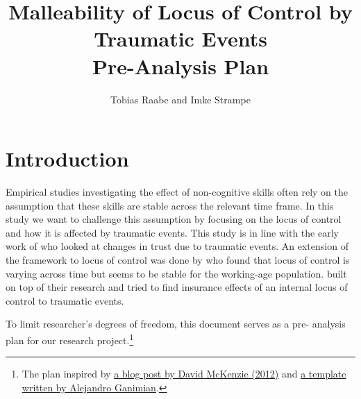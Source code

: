 \documentclass{scrartcl}
\author{Tobias Raabe and Imke Strampe}
\title{Malleability of Locus of Control by Traumatic Events\\[0.5cm]
\Large Pre-Analysis Plan}
\begin{document}
\maketitle



\section{Introduction} %
\label{sec:introduction}

Empirical studies investigating the effect of non-cognitive skills often rely
on the assumption that these skills are stable across the relevant time frame.
In this study we want to challenge this assumption by focusing on the locus of
control and how it is affected by traumatic events. This study is in line with
the early work of \citet{alesina2002} who looked at changes in trust due to
traumatic events. An extension of the framework to locus of control was done by
\citet{cobb2013} who found that locus of control is varying across time but
seems to be stable for the working-age population. \citet{buddelmeyer2016}
built on top of their research and tried to find insurance effects of an
internal locus of control to traumatic events.

To limit researcher's degrees of freedom, this document serves as a pre-
analysis plan for our research project.\footnote{The plan inspired by
\href{https://blogs.worldbank.org/impactevaluations/a-pre-analysis-plan-
checklist}{a blog post by David McKenzie (2012)} and
\href{http://cega.berkeley.edu/assets/cega_events/92/Pre-
Analysis_Plan_Template_Alejandro_Ganimian.pdf}{a template written by Alejandro
Ganimian}.}
\end{document}
